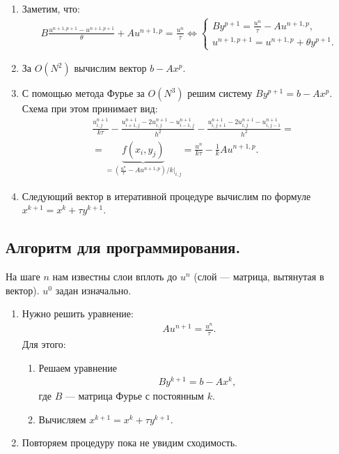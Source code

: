 \documentclass[14pt,a4paper]{extarticle}
\newcommand{\1}{\mathbbm{1}}
\begin{document}
\begin{enumerate}
    \item Заметим, что:
    \begin{align*}
        B \frac{u^{n+1, p+1} - u^{n+1, p+1}}{\theta} + A u^{n+1, p} = \frac{u^{n}}{\tau}\Leftrightarrow 
        \left\{\begin{array}{l}
            B y^{p+1} = \frac{u^{n}}{\tau} - A u^{n+1, p}, \\
            u^{n+1, p+1} = u^{n+1, p} + \theta y^{p+1}.
        \end{array}\right.
    \end{align*}
    \item За $O(N^2)$ вычислим вектор $b - A x^p$.
    \item С помощью метода Фурье за $O(N^3)$ решим систему $B y^{p+1} = b - A x^p$. Схема при этом принимает вид:
\begin{align*}
    &\frac{u^{n+1}_{i,j}}{k \tau} - 
    \frac{u^{n+1}_{i+1, j} - 2 u^{n+1}_{i, j}- u^{n+1}_{i-1, j}}{h^2} -  
    \frac{u^{n+1}_{i, j+1} - 2 u^{n+1}_{i, j}- u^{n+1}_{i, j-1}}{h^2} =\\&= 
    \underbrace{f(x_i, y_j)}_{= (\frac{u^{n}}{\tau} - A u^{n+1, p})/k\big|_{i,j}} = \frac{u^{n}}{k\tau} - \frac{1}{k} A u^{n+1, p}.
\end{align*}

    \item Следующий вектор в итеративной процедуре вычислим по формуле $x^{k+1} = x^k + \tau y^{k+1}$.
\end{enumerate}
\subsection{Алгоритм для программирования.}
На шаге $n$ нам известны слои вплоть до $u^n$ (слой --- матрица, вытянутая в вектор). $u^0$ задан изначально. 
\begin{enumerate} 
    \item Нужно решить уравнение:
    \begin{align*}
        A u^{n+1} = \frac{u^n}{\tau}.
    \end{align*}
    Для этого:
    \begin{enumerate}
        \item Решаем уравнение 
        \begin{align*}
            B y^{k+1} = b - A x^k,
        \end{align*}
        где $B$ --- матрица Фурье с постоянным $k$.
        \item Вычисляем $x^{k+1}=x^k + \tau y^{k+1}$.
    \end{enumerate}
    \item Повторяем процедуру пока не увидим сходимость.
\end{enumerate}
 
\end{document}
